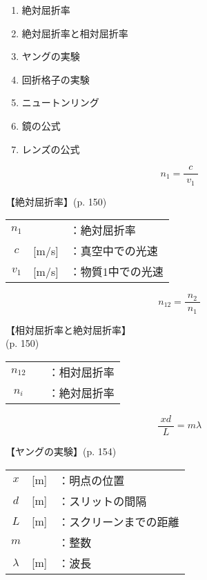 \documentclass[10pt]{jarticle}
\begin{document}
\begin{enumerate}
\setcounter{enumi}{\thepage}
\small
\itemsep-4mm
\item 絶対屈折率\\
\item 絶対屈折率と相対屈折率\\
\item ヤングの実験\\
\item 回折格子の実験\\
\item ニュートンリング\\
\item 鏡の公式\\
\item レンズの公式\\
\end{enumerate}
\newpage




\[
n_1 = \frac{c}{\; v_1 \;}
\]


\vskip3mm
【絶対屈折率】{\footnotesize (p. 150)}

\begin{tabular}{ccl}
$n_1$	&	&：絶対屈折率\\
$c$	& [m/s]	&：真空中での光速\\
$v_1$	& [m/s]	&：物質1中での光速\\
\end{tabular}

\newpage

\[
n_{12} = \frac{n_2}{\; n_1 \;}
\]


\vskip3mm
【相対屈折率と絶対屈折率】\\
\hfill {\footnotesize (p. 150)}

\begin{tabular}{ccl}
$n_{12}$	&	&：相対屈折率\\
$n_i$	&	&：絶対屈折率\\
\end{tabular}

\newpage






\[
\frac{\; xd \;}{L} = m \lambda
\]


\vskip3mm
【ヤングの実験】{\footnotesize (p. 154)}

\begin{tabular}{ccl}
$x$	&[m]	&：明点の位置\\
$d$	&[m]	&：スリットの間隔\\
$L$	&[m]	&：{\small スクリーンまでの距離}\\
$m$	&	&：整数\\
$\lambda$	&[m]	&：波長
\end{tabular}
\end{document}
